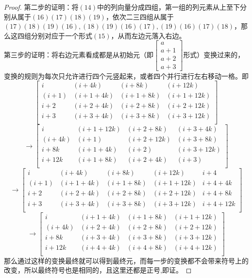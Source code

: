 \documentclass[twoside,a4paper,CCT]{cctart}   %
\begin{document}
\begin{proof}
第二步的证明：将$(14)$中的列向量分成四组，第一组的列元素从上至下分别从属于$(16)(17)(18)(19)$，依次二三四组从属于$(17)(18)(19)(16),(18)(19)(16)(17),(19)(16)(17)(18)$，那么这四组分别对应于一个形式$(15)$，从而左边元落入右边。\\
第三步的证明：将右边元素看成都是从初始元（即$\begin{bmatrix}a\\a+1\\a+2\\a+3 \end{bmatrix}$形式）变换过来的，变换的规则为每次只允许进行四个元竖起来，或者四个并行进行左右移动一格。即
$$\begin{bmatrix}i&(i+4k)&(i+8k)&(i+12k)\\
(i+1)&(i+1+4k)&(i+1+8k)&(i+1+12k)\\
i+2&(i+2+4k)&(i+2+8k)&(i+2+12k)\\
i+3&(i+3+4k)&(i+3+8k)&(i+3+12k)\\\end{bmatrix}$$
$$\rightarrow\begin{bmatrix}i&(i+1+12k)&(i+2+8k)&(i+3+4k)\\
(i+4k)&(i+1)&(i+2+12k)&(i+3+8k)\\
i+8k&(i+1+4k)&(i+2)&(i+3+12k)\\
i+12k&(i+1+8k)&(i+2+4k)&(i+3)\\\end{bmatrix}$$
$$\rightarrow\begin{bmatrix}i&(i+4k)&(i+8k)&(i+12k)&i+4\\
(i+1)&(i+1+4k)&(i+1+8k)&(i+1+12k)&i+4+4k\\
i+2&(i+2+4k)&(i+2+8k)&(i+2+12k)&i+4+8k\\
i+3&(i+3+4k)&(i+3+8k)&(i+3+12k)&i+4+12k\\\end{bmatrix}$$
$$\rightarrow\begin{bmatrix}i&(i+1+4k)&(i+1+8k)&(i+1+12k)\\
(i+4k)&(i+2+4k)&(i+2+8k)&(i+2+12k)\\
i+8k&(i+3+4k)&(i+3+8k)&(i+3+12k)\\
i+12k&(i+4+4k)&(i+4+8k)&(i+4+12k)\\\end{bmatrix}$$ 那么通过这样的变换最终就可以得到最终元，而每一步的变换都不会带来符号上的改变，所以最终符号也是相同的，且这里还都是正号,即证。
\end{proof}
\end{document}
